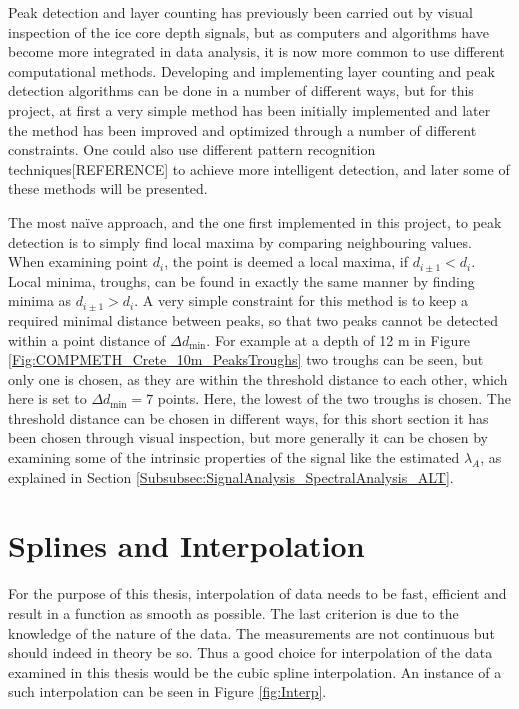 \documentclass[../../CompleteThesis2/Complete_2ndDraft]{subfiles}
\begin{document}
Peak detection and layer counting has previously been carried out by visual inspection of the ice core depth signals, but as computers and algorithms have become more integrated in data analysis, it is now more common to use different computational methods. Developing and implementing layer counting and peak detection algorithms can be done in a number of different ways, but for this project, at first a very simple method has been initially implemented and later the method has been improved and optimized through a number of different constraints. One could also use different pattern recognition techniques[REFERENCE] to achieve more intelligent detection, and later some of these methods will be presented.

The most naïve approach, and the one first implemented in this project, to peak detection is to simply find local maxima by comparing neighbouring values. When examining point $d_i$, the point is deemed a local maxima, if $d_{i\pm1} < d_i$. Local minima, troughs, can be found in exactly the same manner by finding minima as $d_{i\pm1} > d_i$. A very simple constraint for this method is to keep a required minimal distance between peaks, so that two peaks cannot be detected within a point distance of $\Delta d_{\text{min}}$. For example at a depth of 12 m in Figure \ref{Fig:COMPMETH_Crete_10m_PeaksTroughs} two troughs can be seen, but only one is chosen, as they are within the threshold distance to each other, which here is set to $\Delta d_{\text{min}} = 7$ points. Here, the lowest of the two troughs is chosen. The threshold distance can be chosen in different ways, for this short section it has been chosen through visual inspection, but more generally it can be chosen by examining some of the intrinsic properties of the signal like the estimated $\lambda_A$, as explained in Section \ref{Subsubsec:SignalAnalysis_SpectralAnalysis_ALT}.





\section[Splines and Interpolation]{Splines and Interpolation}	
\label{Sec:CompMeths_SplinesAndInterpolation}
For the purpose of this thesis, interpolation of data needs to be fast, efficient and result in a function as smooth as possible. The last criterion is due to the knowledge of the nature of the data. The measurements are not continuous but should indeed in theory be so. Thus a good choice for interpolation of the data examined in this thesis would be the cubic spline interpolation. An instance of a such interpolation can be seen in Figure \ref{fig:Interp}.
\end{document}
